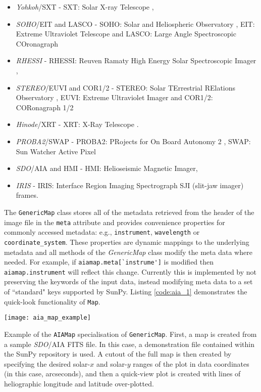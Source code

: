 \begin{itemize}
\item \textit{Yohkoh}/SXT - SXT: Solar X-ray Telescope \citep{1991SoPh..136....1O, 1991SoPh..136...37T},
\item \textit{SOHO}/EIT and LASCO - SOHO: Solar and Heliospheric Observatory \citep{domingo1995}, EIT: Extreme Ultraviolet Telescope \citep{1995SoPh..162..291D} and LASCO: Large Angle Spectroscopic COronagraph \citep{1995SoPh..162..357B}
\item \textit{RHESSI} - RHESSI: Reuven Ramaty High Energy Solar Spectroscopic Imager \citep{2002SoPh..210....3L},
\item \textit{STEREO}/EUVI and COR1/2 - STEREO: Solar TErrestrial RElations Observatory \citep{2005AdSpR..36.1483K}, EUVI: Extreme Ultraviolet Imager \citep{2004SPIE.5171..111W} and COR1/2: CORonagraph 1/2 \citep{2002AdSpR..29.2017H}
\item \textit{Hinode}/XRT - XRT: X-Ray Telescope \citep{2007SoPh..243....3K, 2007SoPh..243...63G}.
\item \textit{PROBA2}/SWAP - PROBA2: PRojects for On Board Autonomy 2 \citep{2013SoPh..286....5S}, SWAP: Sun Watcher Active Pixel \citep{2013SoPh..286...43S}
\item \textit{SDO}/AIA and HMI - HMI: Helioseismic Magnetic Imager, \citep{2012SoPh..275..207S}
\item \textit{IRIS} - IRIS: Interface Region Imaging Spectrograph \citep{2011SPD....42.1512L} SJI (slit-jaw imager) frames.           
\end{itemize}
             
The \texttt{GenericMap} class stores all of the metadata retrieved from the header of
the image file in the \texttt{meta} attribute and provides convenience 
properties for commonly accessed metadata: e.g., \texttt{instrument}, 
\texttt{wavelength} or \texttt{coordinate\_system}.
These properties are dynamic mappings to the underlying metadata and all methods 
of the \textit{GenericMap} class modify the meta data where needed.
For example, if \verb|aiamap.meta[`instrume']| is modified then \verb|aiamap.instrument| 
will reflect this change.
Currently this is implemented by not preserving the keywords of the input data,
instead modifying meta data to a set of ``standard" keys supported by SunPy.
Listing \ref{code:aia_1} demonstrates the quick-look functionality of 
\texttt{Map}.

\begin{listing}[H]
\begin{center}
\texttt{[image: aia\_map\_example]}
\end{center}
\caption{Example of the \texttt{AIAMap} specialisation of 
\texttt{GenericMap}. First, a map is created from a sample \textit{SDO}/AIA FITS file. In this case, a demonstration file contained within the SunPy repository is used. A cutout
of the full map is then created by specifying the desired solar-$x$ and solar-$y$ ranges of the plot in data coordinates (in this case, arcseconds), and then a quick-view plot is created with lines of heliographic longitude and latitude over-plotted.}
\label{code:aia_1}
\end{listing}

